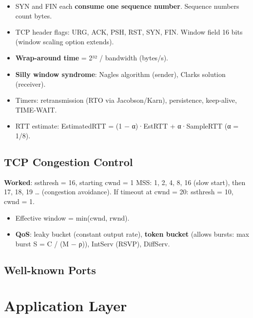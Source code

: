 \begin{itemize}
\tightlist
\item
  SYN and FIN each \textbf{consume one sequence number}. Sequence numbers count bytes.
\item
  TCP header flags: URG, ACK, PSH, RST, SYN, FIN. Window field 16 bits (window scaling option extends).
\item
  \textbf{Wrap-around time} = 2³² / bandwidth (bytes/s).
\item
  \textbf{Silly window syndrome}: Nagle\textquotesingle s algorithm (sender), Clark\textquotesingle s solution (receiver).
\item
  Timers: retransmission (RTO via Jacobson/Karn), persistence, keep-alive, TIME-WAIT.
\item
  RTT estimate: EstimatedRTT = (1 − α)·EstRTT + α·SampleRTT (α = 1/8).
\end{itemize}

\needspace{95pt}

\hypertarget{p2-09--tcp-congestion-control}{%
\subsection{TCP Congestion Control}\label{p2-09--tcp-congestion-control}}



\textbf{Worked}: ssthresh = 16, starting cwnd = 1 MSS: 1, 2, 4, 8, 16 (slow start), then 17, 18, 19 \ldots{} (congestion avoidance). If timeout at cwnd = 20: ssthresh = 10, cwnd = 1.

\begin{itemize}
\tightlist
\item
  Effective window = min(cwnd, rwnd).
\item
  \textbf{QoS}: leaky bucket (constant output rate), \textbf{token bucket} (allows bursts: max burst S = C / (M − ρ)), IntServ (RSVP), DiffServ.
\end{itemize}

\needspace{95pt}

\hypertarget{p2-09--well-known-ports}{%
\subsection{Well-known Ports}\label{p2-09--well-known-ports}}



\needspace{95pt}

\hypertarget{p2-09--10-application-layer}{%
\section{Application Layer}\label{p2-09--10-application-layer}}

